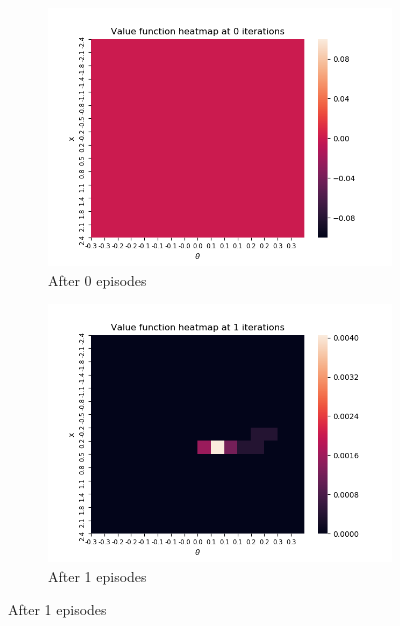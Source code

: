 \documentclass[a4paper]{article}
\begin{document}
\begin{figure}[h!]
    \centering
    \begin{subfigure}[b]{0.4\textwidth}
        \centering
        \includegraphics[width=\textwidth]{Heatmap_0.png}
        \caption{After 0 episodes}
    \end{subfigure}
    \centering
    \begin{subfigure}[b]{0.4\textwidth}
        \centering
        \includegraphics[width=\textwidth]{Heatmap_1.png}
        \caption{After 1 episodes}
    \end{subfigure}


\end{figure}
\end{document}
